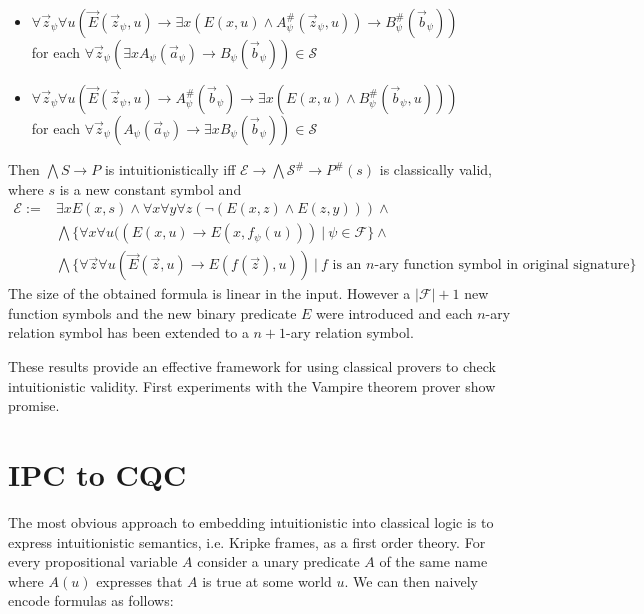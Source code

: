 \documentclass[a4paper,UKenglish,cleveref, autoref, thm-restate]{lipics-v2021}
\begin{document}
\begin{theorem}
\begin{itemize}
		\item $\forall \vec z_\psi\forall u(\vec E(\vec z_\psi, u)\to \exists x(E(x, u)\wedge A^\#_\psi(\vec z_\psi, u))\to B^\#_\psi(\vec b_\psi))$\\for each $\forall \vec z_\psi(\exists xA_\psi(\vec a_\psi)\to B_\psi(\vec b_\psi))\in\mathcal S$
		\item $\forall \vec z_\psi\forall u(\vec E(\vec z_\psi, u)\to A^\#_\psi(\vec b_\psi)\to \exists x(E(x, u)\wedge B^\#_\psi(\vec b_\psi, u)))$\\for each $\forall \vec z_\psi(A_\psi(\vec a_\psi)\to \exists xB_\psi(\vec b_\psi))\in\mathcal S$
	\end{itemize}
	Then $\bigwedge S\to P$ is intuitionistically iff $\mathcal E\to \bigwedge\mathcal S^\#\to P^\#(s)$ is classically valid, where $s$ is a new constant symbol and
	\begin{align*}
		\mathcal E := &\exists xE(x, s)\wedge \forall x\forall y\forall z(\neg(E(x, z)\wedge E(z, y)))\wedge\\
		& \bigwedge\{\forall x\forall u((E(x, u)\to E(x, f_\psi(u)))\:|\:\psi\in\mathcal F\}\wedge\\
		& \bigwedge\{\forall\vec z\forall u(\vec E(\vec z, u)\to E(f(\vec z), u))\:|\:\text{$f$ is an $n$-ary function symbol in original signature}\}
	\end{align*}
	The size of the obtained formula is linear in the input. However a $|\mathcal F| + 1$ new function symbols and the new binary predicate $E$ were introduced and each $n$-ary relation symbol has been extended to a $n+1$-ary relation symbol.
\end{theorem}

These results provide an effective framework for using classical provers to check intuitionistic validity. First experiments with the Vampire theorem prover show promise.


\section{IPC to CQC}

The most obvious approach to embedding intuitionistic into classical logic is to express intuitionistic semantics, i.e. Kripke frames, as a first order theory. For every propositional variable $A$ consider a unary predicate $A$ of the same name where $A(u)$ expresses that $A$ is true at some world $u$. We can then naively encode formulas as follows:
\end{document}
